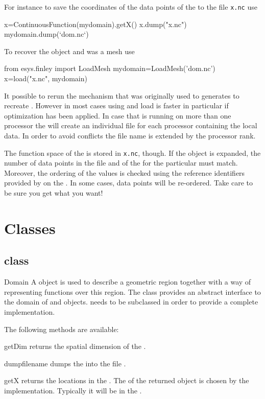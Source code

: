 For instance to save the coordinates of the data points of the
\ContinuousFunction to the file {\tt x.nc} use 
\begin{python}
  x=ContinuousFunction(mydomain).getX()
  x.dump("x.nc")
  mydomain.dump(`dom.nc`)
\end{python}
To recover the object  and  was a \finley mesh use
\begin{python}
  from esys.finley import LoadMesh
  mydomain=LoadMesh('dom.nc')
  x=load("x.nc", mydomain)
\end{python}
It possible to rerun the mechanism that was originally used to generates
 to recreate . However in most cases using  and
load is faster in particular if optimization has been applied. In case that
\escript is running on more than one \MPI processor the  will create an individual file for each processor containing the local data. In order to avoid conflicts the file name is extended by the \MPI processor rank.

The function space of the \Data is stored in {\tt x.nc}, though.
If the \Data object
is expanded, the number of data points in the file and of the \Domain for the particular \FunctionSpace must match. 
Moreover, the ordering of the values is checked using the reference identifiers provided by 
\FunctionSpace on the \Domain. In some cases, data points will be re-ordered. Take care to be sure you get what you want!


\section{\escript Classes}

\subsection{\Domain class}
\begin{classdesc}{Domain}{}
A \Domain object is used to describe a geometric region together with 
a way of representing functions over this region.
The \Domain class provides an abstract interface to the domain of \FunctionSpace and \Data objects.
\Domain needs to be subclassed in order to provide a complete implementation.
\end{classdesc}
The following methods are available:
\begin{methoddesc}[Domain]{getDim}{}
returns the spatial dimension of the \Domain.
\end{methoddesc}
\begin{methoddesc}[Domain]{dump}{filename}
dumps the \Domain into the file .
\end{methoddesc}
\begin{methoddesc}[Domain]{getX}{}
returns the locations in the \Domain. The \FunctionSpace of the returned
\Data object is chosen by the \Domain implementation. Typically it will be
in the \Function.
\end{methoddesc}

